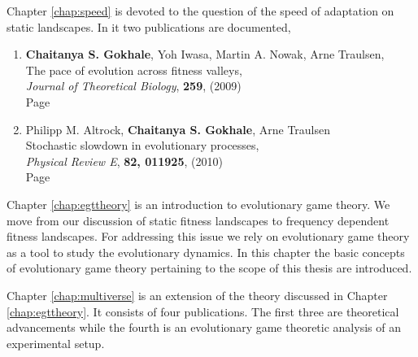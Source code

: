 \documentclass[oneside,11pt,a4paper]{book}
\begin{document}
\noindent
Chapter \ref{chap:speed} is devoted to the question of the speed of adaptation on static landscapes.
In it two publications are documented,
%
\begin{enumerate}[2.1]

\item \textbf{Chaitanya S. Gokhale}, Yoh Iwasa, Martin A. Nowak, Arne Traulsen,\\
  	The pace of evolution across fitness valleys,\\
	\textit{Journal of Theoretical Biology}, \textbf{259}, (2009)\\
	Page \pageref{sec:fitval}

\item Philipp M. Altrock, \textbf{Chaitanya S. Gokhale}, Arne Traulsen\\
  	Stochastic slowdown in evolutionary processes,\\
	\textit{Physical Review E}, \textbf{82, 011925}, (2010)\\
	Page \pageref{sec:stoslo}

\end{enumerate}
%

\noindent
Chapter \ref{chap:egttheory} is an introduction to evolutionary game theory.
We move from our discussion of static fitness landscapes to frequency dependent fitness landscapes.
For addressing this issue we rely on evolutionary game theory as a tool to study the evolutionary dynamics.
In this chapter the basic concepts of evolutionary game theory pertaining to the scope of this thesis are introduced.

\noindent
Chapter \ref{chap:multiverse} is an extension of the theory discussed in Chapter \ref{chap:egttheory}.
It consists of four publications.
The  first three are theoretical advancements while the fourth is an evolutionary game theoretic analysis of an experimental setup.
\end{document}
